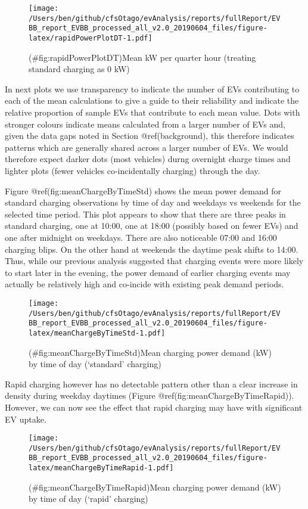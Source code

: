 \documentclass[]{article}
\begin{document}
\begin{figure}
\centering
\texttt{[image: /Users/ben/github/cfsOtago/evAnalysis/reports/fullReport/EVBB\_report\_EVBB\_processed\_all\_v2.0\_20190604\_files/figure-latex/rapidPowerPlotDT-1.pdf]}
\caption{(\#fig:rapidPowerPlotDT)Mean kW per quarter hour (treating standard charging as 0 kW)}
\end{figure}

In next plots we use transparency to indicate the number of EVs contributing to each of the mean calculations to give a guide to their reliability and indicate the relative proportion of sample EVs that contribute to each mean value. Dots with stronger colours indicate means calculated from a larger number of EVs and, given the data gaps noted in Section @ref(background), this therefore indicates patterns which are generally shared across a larger number of EVs. We would therefore expect darker dots (most vehicles) durng overnight charge times and lighter plots (fewer vehicles co-incidentally charging) through the day.

Figure @ref(fig:meanChargeByTimeStd) shows the mean power demand for standard charging observations by time of day and weekdays vs weekends for the selected time period. This plot appears to show that there are three peaks in standard charging, one at 10:00, one at 18:00 (possibly based on fewer EVs) and one after midnight on weekdays. There are also noticeable 07:00 and 16:00 charging blips. On the other hand at weekends the daytime peak shifts to 14:00. Thus, while our previous analysis suggested that charging events were more likely to start later in the evening, the power demand of earlier charging events may actually be relatively high and co-incide with existing peak demand periods.

\begin{figure}
\centering
\texttt{[image: /Users/ben/github/cfsOtago/evAnalysis/reports/fullReport/EVBB\_report\_EVBB\_processed\_all\_v2.0\_20190604\_files/figure-latex/meanChargeByTimeStd-1.pdf]}
\caption{(\#fig:meanChargeByTimeStd)Mean charging power demand (kW) by time of day (`standard' charging)}
\end{figure}

Rapid charging however has no detectable pattern other than a clear increase in density during weekday daytimes (Figure @ref(fig:meanChargeByTimeRapid)). However, we can now see the effect that rapid charging may have with significant EV uptake.

\begin{figure}
\centering
\texttt{[image: /Users/ben/github/cfsOtago/evAnalysis/reports/fullReport/EVBB\_report\_EVBB\_processed\_all\_v2.0\_20190604\_files/figure-latex/meanChargeByTimeRapid-1.pdf]}
\caption{(\#fig:meanChargeByTimeRapid)Mean charging power demand (kW) by time of day (`rapid' charging)}
\end{figure}
\end{document}
